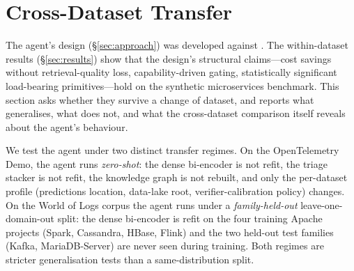 %
%

\section{Cross-Dataset Transfer}
\label{sec:cross-app}

The agent's design (\S\ref{sec:approach}) was developed against \dsob{}. The within-dataset results (\S\ref{sec:results}) show that the design's structural claims---cost savings without retrieval-quality loss, capability-driven gating, statistically significant load-bearing primitives---hold on the synthetic microservices benchmark. This section asks whether they survive a change of dataset, and reports what generalises, what does not, and what the cross-dataset comparison itself reveals about the agent's behaviour.

We test the agent under two distinct transfer regimes. On the OpenTelemetry Demo, the agent runs \emph{zero-shot}: the dense bi-encoder is not refit, the triage stacker is not refit, the knowledge graph is not rebuilt, and only the per-dataset profile (predictions location, data-lake root, verifier-calibration policy) changes. On the World of Logs corpus the agent runs under a \emph{family-held-out} leave-one-domain-out split: the dense bi-encoder is refit on the four training Apache projects (Spark, Cassandra, HBase, Flink) and the two held-out test families (Kafka, MariaDB-Server) are never seen during training. Both regimes are stricter generalisation tests than a same-distribution split.

